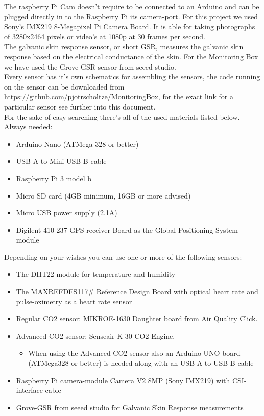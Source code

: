 \documentclass{report}
\begin{document}
The raspberry Pi Cam doesn't require to be connected to an Arduino and can be plugged directly in to the Raspberry Pi its camera-port. For this project we used Sony's IMX219 8-Megapixel Pi Camera Board. It is able for taking photographs of 3280x2464 pixels or video's at 1080p at 30 frames per second. \\

The galvanic skin response sensor, or short GSR, measures the galvanic skin response based on the electrical conductance of the skin. For the Monitoring Box we have used the Grove-GSR sensor from seeed studio.\\

Every sensor has it's own schematics for assembling the sensors, the code running on the sensor can be downloaded from https://github.com/pjotrscholtze/MonitoringBox, for the exact link for a particular sensor see further into this document.  \\

For the sake of easy searching there's all of the used materials listed below.\\

Always needed:

\begin{itemize}

\item Arduino Nano (ATMega 328 or better)
\item USB A to Mini-USB B cable
\item Raspberry Pi 3 model b
\item Micro SD card (4GB minimum, 16GB or more advised)
\item Micro USB power supply (2.1A)
\item Digilent 410-237 GPS-receiver Board as the Global Positioning System module
\end{itemize}
Depending on your wishes you can use one or more of the following sensors: 
\begin{itemize}
\item The DHT22 module for temperature and humidity
\item The MAXREFDES117\# Reference Design Board with optical heart rate and pulse-oximetry as a heart rate sensor
\item Regular CO2 sensor: MIKROE-1630 Daughter board from Air Quality Click. 
\item Advanced CO2 sensor: Senseair K-30 CO2 Engine.
\begin{itemize}
\item When using the Advanced CO2 sensor also an Arduino UNO board (ATMega328 or better) is needed along with an USB A to USB B cable 
\end{itemize} 
\item Raspberry Pi camera-module Camera V2 8MP (Sony IMX219) with CSI-interface cable
\item Grove-GSR from seeed studio for Galvanic Skin Response measurements
\end{itemize}
\end{document}
